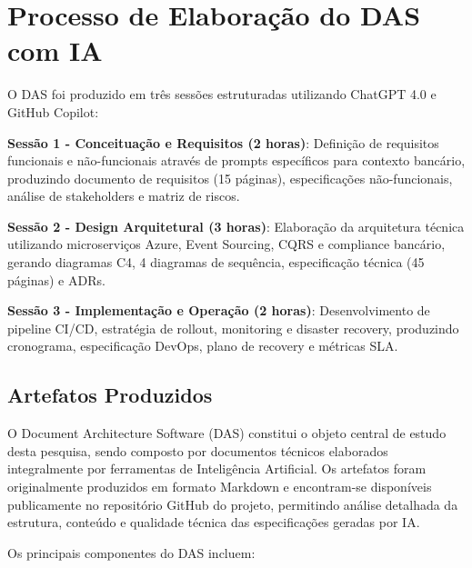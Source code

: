 \section{Processo de Elaboração do DAS com IA}

O DAS foi produzido em três sessões estruturadas utilizando ChatGPT 4.0 e GitHub Copilot:

\textbf{Sessão 1 - Conceituação e Requisitos (2 horas)}: Definição de requisitos funcionais e não-funcionais através de prompts específicos para contexto bancário, produzindo documento de requisitos (15 páginas), especificações não-funcionais, análise de stakeholders e matriz de riscos.

\textbf{Sessão 2 - Design Arquitetural (3 horas)}: Elaboração da arquitetura técnica utilizando microserviços Azure, Event Sourcing, CQRS e compliance bancário, gerando diagramas C4, 4 diagramas de sequência, especificação técnica (45 páginas) e ADRs.

\textbf{Sessão 3 - Implementação e Operação (2 horas)}: Desenvolvimento de pipeline CI/CD, estratégia de rollout, monitoring e disaster recovery, produzindo cronograma, especificação DevOps, plano de recovery e métricas SLA.

\subsection{Artefatos Produzidos}

O Document Architecture Software (DAS) constitui o objeto central de estudo desta pesquisa, sendo composto por documentos técnicos elaborados integralmente por ferramentas de Inteligência Artificial. Os artefatos foram originalmente produzidos em formato Markdown e encontram-se disponíveis publicamente no repositório GitHub do projeto, permitindo análise detalhada da estrutura, conteúdo e qualidade técnica das especificações geradas por IA.

Os principais componentes do DAS incluem:


